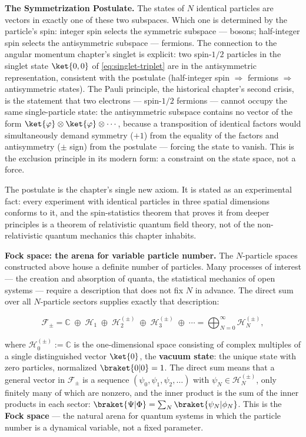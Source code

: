 \medskip\noindent\textbf{The Symmetrization Postulate.}
The states of $N$ identical particles are vectors in exactly one of these two subspaces. Which one is determined by the particle's spin: integer spin selects the symmetric subspace --- bosons; half-integer spin selects the antisymmetric subspace --- fermions. The connection to the angular momentum chapter's singlet is explicit: two spin-$1/2$ particles in the singlet state $\ket{0,0}$ of \eqref{eq:singlet-triplet} are in the antisymmetric representation, consistent with the postulate (half-integer spin $\Rightarrow$ fermions $\Rightarrow$ antisymmetric states). The Pauli principle, the historical chapter's second crisis, is the statement that two electrons --- spin-$1/2$ fermions --- cannot occupy the same single-particle state: the antisymmetric subspace contains no vector of the form $\ket{\varphi} \otimes \ket{\varphi} \otimes \cdots$, because a transposition of identical factors would simultaneously demand symmetry ($+1$) from the equality of the factors and antisymmetry ($\pm$ sign) from the postulate --- forcing the state to vanish. This is the exclusion principle in its modern form: a constraint on the state space, not a force.

The postulate is the chapter's single new axiom. It is stated as an experimental fact: every experiment with identical particles in three spatial dimensions conforms to it, and the spin-statistics theorem that proves it from deeper principles is a theorem of relativistic quantum field theory, not of the non-relativistic quantum mechanics this chapter inhabits.

\medskip\noindent\textbf{Fock space: the arena for variable particle number.}
The $N$-particle spaces constructed above house a definite number of particles. Many processes of interest --- the creation and absorption of quanta, the statistical mechanics of open systems --- require a description that does not fix $N$ in advance. The direct sum over all $N$-particle sectors supplies exactly that description:
\begin{linenomath}
    \begin{equation}
        \mathcal{F}_\pm
        = \mathbb{C} \;\oplus\; \mathcal{H}_1 \;\oplus\; \mathcal{H}_2^{(\pm)} \;\oplus\; \mathcal{H}_3^{(\pm)} \;\oplus\; \cdots
        = \bigoplus_{N=0}^{\infty} \mathcal{H}_N^{(\pm)},
        \label{eq:fock-space}
    \end{equation}
\end{linenomath}
where $\mathcal{H}_0^{(\pm)} := \mathbb{C}$ is the one-dimensional space consisting of complex multiples of a single distinguished vector $\ket{0}$, the \textbf{vacuum state}: the unique state with zero particles, normalized $\braket{0|0} = 1$. The direct sum means that a general vector in $\mathcal{F}_\pm$ is a sequence $(\psi_0, \psi_1, \psi_2, \ldots)$ with $\psi_N \in \mathcal{H}_N^{(\pm)}$, only finitely many of which are nonzero, and the inner product is the sum of the inner products in each sector: $\braket{\Psi|\Phi} = \sum_N \braket{\psi_N|\phi_N}$. This is the \textbf{Fock space} --- the natural arena for quantum systems in which the particle number is a dynamical variable, not a fixed parameter.

